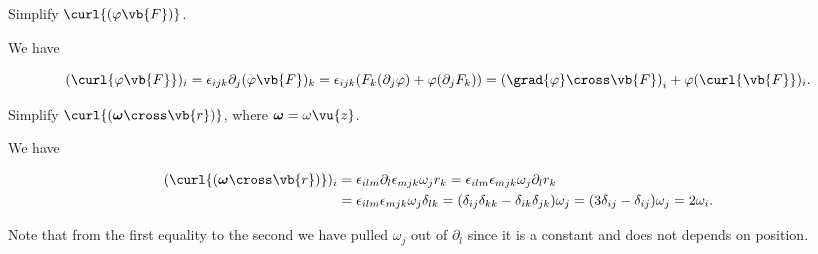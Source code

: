\documentclass[english,a4paper,12pt]{report}
\begin{document}
{Simplify \(\curl{(\varphi \vb{F} )} \). }
{We have 

\begin{equation}
	(\curl{\varphi \vb{F} } )_{i} = \epsilon _{ijk}\partial _{j}(\varphi \vb{F} )_{k}  = \epsilon _{ijk}(F_{k} (\partial _{j}\varphi  ) + \varphi (\partial _{j}F_{k} )) = \left( \grad{\varphi } \cross \vb{F}   \right)_{i} + \varphi (\curl{\vb{F} })_{i}.   
\end{equation}

} 

{Simplify \(\curl{(\boldsymbol{\omega } \cross \vb{r}  )} \), where \(\boldsymbol{\omega } = \omega \vu{z} \).  }
{We have 

\begin{equation}
	\begin{aligned} 
	(\curl{(\boldsymbol{\omega }\cross \vb{r}  )} )_{i}  &= \epsilon _{ilm} \partial _{l} \epsilon _{mjk} \omega _{j} r_{k} = \epsilon _{ilm} \epsilon _{mjk} \omega _{j} \partial _{l} r_{k} \\
	&= \epsilon _{ilm} \epsilon _{mjk}  \omega _{j} \delta _{lk}  = (\delta _{ij} \delta _{kk} - \delta _{ik} \delta _{jk}   ) \omega _{j} = (3 \delta _{ij} - \delta _{ij}  ) \omega _{j} = 2\omega _{i}.
	\end{aligned}            
\end{equation}

Note that from the first equality to the second we have pulled \(\omega _{j} \) out of \(\partial _{l} \) since it is a constant and does not depends on position.  

} 
\end{document}
